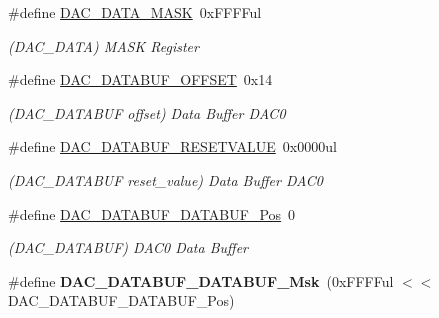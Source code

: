 \begin{DoxyCompactItemize}
\item 
\hypertarget{group___s_a_m_l21___d_a_c_ga1bb2391625c1bf82261cfb3a23c32181}{}\#define \hyperlink{group___s_a_m_l21___d_a_c_ga1bb2391625c1bf82261cfb3a23c32181}{D\+A\+C\+\_\+\+D\+A\+T\+A\+\_\+\+M\+A\+S\+K}~0x\+F\+F\+F\+Ful\label{group___s_a_m_l21___d_a_c_ga1bb2391625c1bf82261cfb3a23c32181}

\begin{DoxyCompactList}\small\item\em (D\+A\+C\+\_\+\+D\+A\+T\+A) M\+A\+S\+K Register \end{DoxyCompactList}\item 
\hypertarget{group___s_a_m_l21___d_a_c_ga925e76e2151662945396d1937062bdf7}{}\#define \hyperlink{group___s_a_m_l21___d_a_c_ga925e76e2151662945396d1937062bdf7}{D\+A\+C\+\_\+\+D\+A\+T\+A\+B\+U\+F\+\_\+\+O\+F\+F\+S\+E\+T}~0x14\label{group___s_a_m_l21___d_a_c_ga925e76e2151662945396d1937062bdf7}

\begin{DoxyCompactList}\small\item\em (D\+A\+C\+\_\+\+D\+A\+T\+A\+B\+U\+F offset) Data Buffer D\+A\+C0 \end{DoxyCompactList}\item 
\hypertarget{group___s_a_m_l21___d_a_c_ga3649ae1cf9dbb0179c3a00c0e210bc23}{}\#define \hyperlink{group___s_a_m_l21___d_a_c_ga3649ae1cf9dbb0179c3a00c0e210bc23}{D\+A\+C\+\_\+\+D\+A\+T\+A\+B\+U\+F\+\_\+\+R\+E\+S\+E\+T\+V\+A\+L\+U\+E}~0x0000ul\label{group___s_a_m_l21___d_a_c_ga3649ae1cf9dbb0179c3a00c0e210bc23}

\begin{DoxyCompactList}\small\item\em (D\+A\+C\+\_\+\+D\+A\+T\+A\+B\+U\+F reset\+\_\+value) Data Buffer D\+A\+C0 \end{DoxyCompactList}\item 
\hypertarget{group___s_a_m_l21___d_a_c_ga3fe3d9c9181741d88429ff03b62828e5}{}\#define \hyperlink{group___s_a_m_l21___d_a_c_ga3fe3d9c9181741d88429ff03b62828e5}{D\+A\+C\+\_\+\+D\+A\+T\+A\+B\+U\+F\+\_\+\+D\+A\+T\+A\+B\+U\+F\+\_\+\+Pos}~0\label{group___s_a_m_l21___d_a_c_ga3fe3d9c9181741d88429ff03b62828e5}

\begin{DoxyCompactList}\small\item\em (D\+A\+C\+\_\+\+D\+A\+T\+A\+B\+U\+F) D\+A\+C0 Data Buffer \end{DoxyCompactList}\item 
\hypertarget{group___s_a_m_l21___d_a_c_gab9b1749e7a45e018441aa8987cc29c16}{}\#define {\bfseries D\+A\+C\+\_\+\+D\+A\+T\+A\+B\+U\+F\+\_\+\+D\+A\+T\+A\+B\+U\+F\+\_\+\+Msk}~(0x\+F\+F\+F\+Ful $<$$<$ D\+A\+C\+\_\+\+D\+A\+T\+A\+B\+U\+F\+\_\+\+D\+A\+T\+A\+B\+U\+F\+\_\+\+Pos)\label{group___s_a_m_l21___d_a_c_gab9b1749e7a45e018441aa8987cc29c16}


\end{DoxyCompactItemize}
